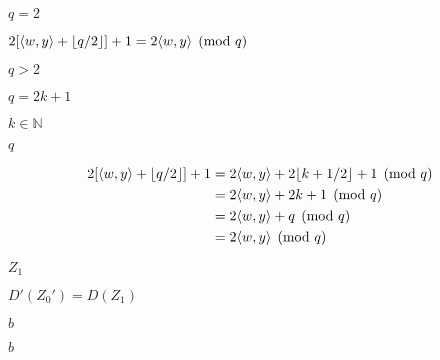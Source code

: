 \documentclass[10pt]{book}
\begin{document}
\begin{mdSnippets}
\begin{mdInlineSnippet}[03e344c5d678f065203d644e6cd8f6a0]
$q = 2$\end{mdInlineSnippet}%
\begin{mdInlineSnippet}[28e24b33ef57b8f38efa9bf42664c8fd]%
$2[\langle w,y \rangle + \lfloor q/2 \rfloor] + 1 = 2\langle w,y \rangle \pmod q$\end{mdInlineSnippet}%
\begin{mdInlineSnippet}%
$q > 2$\end{mdInlineSnippet}%
\begin{mdInlineSnippet}[96b09b7dbe71b5a1bb3143a5d088b933]%
$q = 2k + 1$\end{mdInlineSnippet}%
\begin{mdInlineSnippet}%
$k \in \mathbb{N}$\end{mdInlineSnippet}%
\begin{mdInlineSnippet}[7694f4a66316e53c8cdd9d9954bd611d]%
$q$\end{mdInlineSnippet}%
\begin{mdDisplaySnippet}[5f6c88a021014f8779e0f2ba33d26244]%
\[%
\begin{aligned}
2[\iprod{w,y} + \lfloor q/2 \rfloor] + 1 &= 2\iprod{w,y} + 2\lfloor k +  1/2 \rfloor + 1 \pmod{q}\\
&= 2\iprod{w,y} + 2k + 1 \pmod{q} \\
&= 2\iprod{w,y} + q \pmod{q} \\
&= 2\iprod{w,y} \pmod{q}
\end{aligned}
\]%
\end{mdDisplaySnippet}%
\begin{mdInlineSnippet}[c6847901dd09a7efd9dd75477a521329]%
$Z_1$\end{mdInlineSnippet}%
\begin{mdInlineSnippet}[b360c777f002cdb25e5278b59293eb42]%
$D'(Z_0') = D(Z_1)$\end{mdInlineSnippet}%
\begin{mdInlineSnippet}%
$b$\end{mdInlineSnippet}%
\begin{mdInlineSnippet}%
$b$\end{mdInlineSnippet}%
\begin{mdDisplaySnippet}%

\end{mdDisplaySnippet}
\end{mdSnippets}
\end{document}

